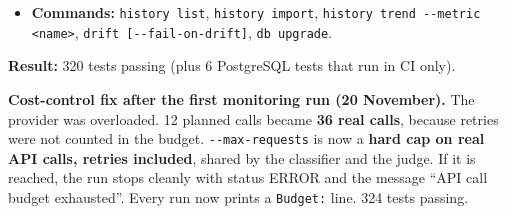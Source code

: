 \documentclass[11pt,a4paper]{article}
\begin{document}
\begin{itemize}
\begin{itemize}
                the baseline by the warn threshold \textbf{and} the last 3 runs are all worse;
          \item with fewer than 3 comparable runs, the answer is \textbf{INSUFFICIENT}, never a
                falsely reassuring OK;
          \item the first drifting run is marked as a \textbf{new episode}, so an alert is sent once;
          \item only gating metrics decide the overall status (an informational metric cannot
                fail a scheduled job).
        \end{itemize}
  \item \textbf{Commands:} \texttt{history list}, \texttt{history import},
        \texttt{history trend -{}-metric <name>}, \texttt{drift [-{}-fail-on-drift]},
        \texttt{db upgrade}.
\end{itemize}
\textbf{Result:} 320 tests passing (plus 6 PostgreSQL tests that run in CI only).

\textbf{Cost-control fix after the first monitoring run (20 November).} The provider was
overloaded. 12 planned calls became \textbf{36 real calls}, because retries were not counted
in the budget. \texttt{-{}-max-requests} is now a \textbf{hard cap on real API calls, retries
included}, shared by the classifier and the judge. If it is reached, the run stops cleanly
with status ERROR and the message ``API call budget exhausted''. Every run now prints a
\texttt{Budget:} line. 324 tests passing.
\end{document}
